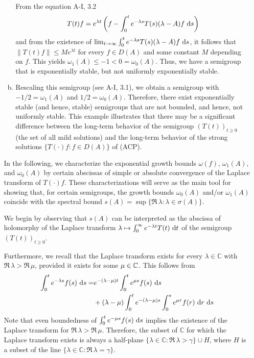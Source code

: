 \begin{example}
\begin{enumerate}[(a), wide, labelsep=1em, itemindent=\parindent]
From the equation A-I, 3.2
\[
T(t)f = e^{\lambda t}\left(f - \int_{0}^{t} e^{-\lambda s} T(s) (\lambda - A)f \,\mathop{}\!\mathrm{d}{s}\right)
\]
and from the existence of $\lim_{t \to \infty} \int_{0}^{t} e^{-\lambda s} T(s) (\lambda - A)f \,\mathop{}\!\mathrm{d}{s}$, it follows that 
$\|T(t)f\| \leq Me^{\lambda t}$ for every $f \in D(A)$ and some constant $M$ depending on $f$. This yields $\omega_{1}(A) \le -1 < 0 = \omega_0(A)$. 
Thus, we have a semigroup that is exponentially stable, but not uniformly exponentially stable.



\item
Rescaling this semigroup (see A-I, 3.1), we obtain a semigroup with $-1/2 = \omega_{1}(A)$ and $1/2 = \omega_0(A)$.
Therefore, there exist exponentially stable (and hence, stable) semigroups that are not bounded, and hence, not uniformly stable.
This example illustrates that there may be a significant difference between the long-term behavior of the semigroup $(T(t))_{t \geq 0}$ (\ie the set of all mild solutions) and the long-term behavior of the strong solutions $\{T(\cdot)f : f \in D(A)\}$ of (ACP). 
\end{enumerate}
\end{example}



In the following, we characterize the exponential growth bounds $\omega(f)$, $\omega_{1}(A)$, and $\omega_0(A)$ by certain abscissas of simple or absolute convergence of the Laplace transform of $T(\cdot)f$. 
These characterizations will serve as the main tool for showing that, for certain semigroups, the growth bounds $\omega_0(A)$ and/or $\omega_{1}(A)$ coincide with the spectral bound $s(A) = \sup\{\Re\,\lambda : \lambda \in \sigma(A)\}$.



We begin by observing that $s(A)$ can be interpreted as the abscissa of holomorphy of the Laplace transform $\lambda \mapsto \int_{0}^{\infty} e^{-\lambda t} T(t) \,\mathop{}\!\mathrm{d}{t}$ of the semigroup $(T(t))_{t \geq 0}$.



Furthermore, we recall that the Laplace transform exists for every $\lambda \in \mathbb{C}$ with $\Re\,\lambda > \Re\,\mu$, provided it exists for some $\mu\in\mathbb{C}$.
This follows from 
\begin{align}\label{eq:a4-1.1}
\int_0^t e^{-\lambda s} f(s)\,\mathop{}\!\mathrm{d}{s} = &e^{-(\lambda-\mu)t} \int_{0}^{t} e^{\mu s} f(s) \,\mathop{}\!\mathrm{d}{s} \\ &+ (\lambda - \mu) \int_{0}^{t} e^{-(\lambda-\mu)s} \int_{0}^{s} e^{\mu r} f(r) \,\mathop{}\!\mathrm{d}{r}\,\mathop{}\!\mathrm{d}{s} \notag
\end{align}
Note that even boundedness of $\int_{0}^{t} e^{-\mu s}f(s) \,\mathop{}\!\mathrm{d}{s}$ implies the existence of the Laplace transform for $\Re\,\lambda > \Re\,\mu$. 
Therefore, the subset of $\mathbb{C}$ for which the Laplace transform exists is always a half-plane 
$\{\lambda \in \mathbb{C} : \Re\,\lambda > \gamma\} \cup H$, where $H$ is a subset of the line $\{\lambda \in \mathbb{C} : \Re\,\lambda = \gamma\}$.

